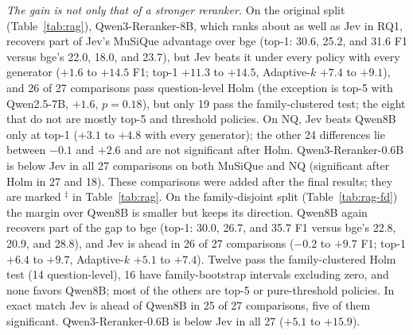 \emph{The gain is not only that of a stronger reranker.} On the original split (Table~\ref{tab:rag}), Qwen3-Reranker-8B, which ranks about as well as Jev in RQ1, recovers part of Jev's MuSiQue advantage over bge (top-1: 30.6, 25.2, and 31.6 F1 versus bge's 22.0, 18.0, and 23.7), but Jev beats it under every policy with every generator ($+1.6$ to $+14.5$ F1; top-1 $+11.3$ to $+14.5$, Adaptive-$k$ $+7.4$ to $+9.1$), and 26 of 27 comparisons pass question-level Holm (the exception is top-5 with Qwen2.5-7B, $+1.6$, $p=0.18$), but only 19 pass the family-clustered test; the eight that do not are mostly top-5 and threshold policies. On NQ, Jev beats Qwen8B only at top-1 ($+3.1$ to $+4.8$ with every generator); the other 24 differences lie between $-0.1$ and $+2.6$ and are not significant after Holm. Qwen3-Reranker-0.6B is below Jev in all 27 comparisons on both MuSiQue and NQ (significant after Holm in 27 and 18). These comparisons were added after the final results; they are marked $^\ddagger$ in Table~\ref{tab:rag}. On the family-disjoint split (Table~\ref{tab:rag-fd}) the margin over Qwen8B is smaller but keeps its direction. Qwen8B again recovers part of the gap to bge (top-1: 30.0, 26.7, and 35.7 F1 versus bge's 22.8, 20.9, and 28.8), and Jev is ahead in 26 of 27 comparisons ($-0.2$ to $+9.7$ F1; top-1 $+6.4$ to $+9.7$, Adaptive-$k$ $+5.1$ to $+7.4$). Twelve pass the family-clustered Holm test (14 question-level), 16 have family-bootstrap intervals excluding zero, and none favors Qwen8B; most of the others are top-5 or pure-threshold policies. In exact match Jev is ahead of Qwen8B in 25 of 27 comparisons, five of them significant. Qwen3-Reranker-0.6B is below Jev in all 27 ($+5.1$ to $+15.9$).

